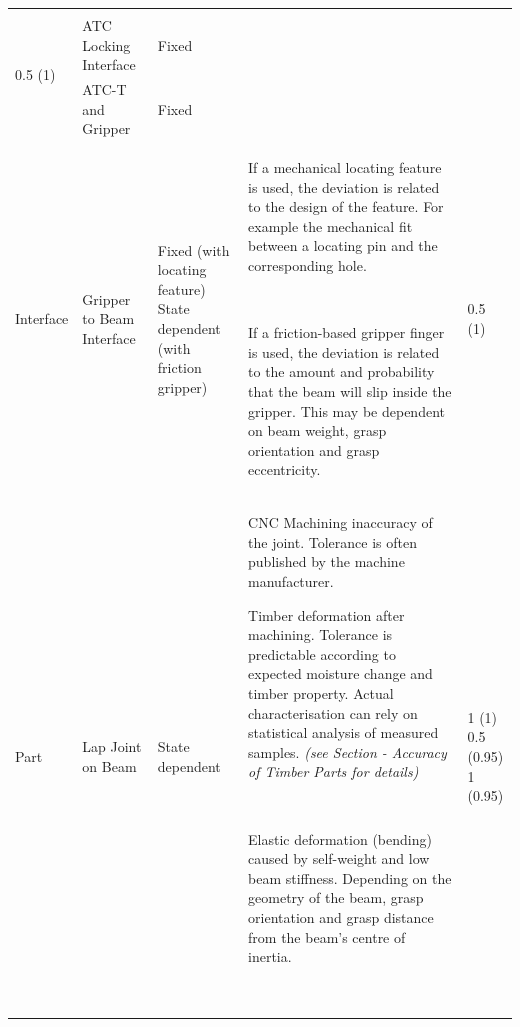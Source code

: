 \documentclass[11pt]{book}
\begin{document}
\begin{table}[H]
\begin{adjustbox}{max width=\textwidth}
\begin{tabular}{p{1.72cm}p{3.94cm}p{1.98cm}p{6.27cm}p{2.01cm}}
\multicolumn{1}{|p{2.01cm}|}{\multirow{3}{*}{\parbox{2.01cm}{{\scriptsize 0.5 (1)}}}} \\ 
\hhline{---~~}
\multicolumn{1}{|p{1.72cm}}{{\scriptsize Interface}} & 
\multicolumn{1}{|p{3.94cm}}{{\scriptsize ATC Locking Interface}} & 
\multicolumn{1}{|p{1.98cm}}{{\scriptsize Fixed}} & 
\multicolumn{1}{|p{6.27cm}}{} & 
\multicolumn{1}{|p{2.01cm}|}{} \\ 
\hhline{---~~}
\multicolumn{1}{|p{1.72cm}}{{\scriptsize Part}} & 
\multicolumn{1}{|p{3.94cm}}{{\scriptsize ATC-T and Gripper}} & 
\multicolumn{1}{|p{1.98cm}}{{\scriptsize Fixed}} & 
\multicolumn{1}{|p{6.27cm}}{} & 
\multicolumn{1}{|p{2.01cm}|}{} \\ 
\hline
\multicolumn{1}{|p{1.72cm}}{{\scriptsize Interface}} & 
\multicolumn{1}{|p{3.94cm}}{{\scriptsize Gripper to Beam Interface}} & 
\multicolumn{1}{|p{1.98cm}}{{\scriptsize Fixed (with locating feature)} \newline
{\scriptsize State dependent (with friction gripper)}} & 
\multicolumn{1}{|p{6.27cm}}{{\scriptsize If a mechanical locating feature is used, the deviation is related to the design of the feature. For example the mechanical fit between a locating pin and the corresponding hole.\par} \newline
{\scriptsize If a friction-based gripper finger is used, the deviation is related to the amount and probability that the beam will slip inside the gripper. This may be dependent on beam weight, grasp orientation and grasp eccentricity.\par}} & 
\multicolumn{1}{|p{2.01cm}|}{{\scriptsize 0.5 (1)}} \\ 
\hline
\multicolumn{1}{|p{1.72cm}}{{\scriptsize Part}} & 
\multicolumn{1}{|p{3.94cm}}{{\scriptsize Lap Joint on Beam}} & 
\multicolumn{1}{|p{1.98cm}}{{\scriptsize State dependent }} & 
\multicolumn{1}{|p{6.27cm}}{{\scriptsize CNC Machining inaccuracy of the joint. Tolerance is often published by the machine manufacturer.} \newline
{\scriptsize Timber deformation after machining. Tolerance is predictable according to expected moisture change and timber property. Actual characterisation can rely on statistical analysis of measured samples. \textit{(see Section - Accuracy of Timber Parts for details)}\par} \newline
{\scriptsize Elastic deformation (bending) caused by self-weight and low beam stiffness. Depending on the geometry of the beam, grasp orientation and grasp distance from the beam’s centre of inertia. \par} \newline
} & 
\multicolumn{1}{|p{2.01cm}|}{{\scriptsize 1 (1)} \newline
{\scriptsize 0.5 (0.95)} \newline
{\scriptsize 1 (0.95)}} \\ 
\hline
\end{tabular}
\end{adjustbox}
\end{table}
\end{document}
